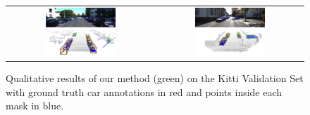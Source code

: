 \begin{figure}
    \centering
    \begin{tabular}{c c}
        \includegraphics[width=0.5\textwidth]{figures/Qualitative_examples/314.png} & 
        \includegraphics[width=0.5\textwidth]{figures/Qualitative_examples/245.png} \\
         
        
 

        
    \end{tabular}
    \caption{Qualitative results of our method (green) on the Kitti Validation Set with ground truth car annotations in red and points inside each mask in blue.}
    \label{f:Qualitative}
\end{figure}